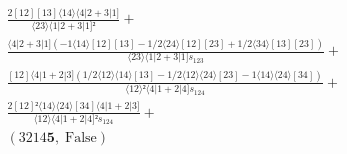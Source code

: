 \documentclass[varwidth, border=5pt]{standalone}
\begin{document}
\begin{my}
$\begin{gathered}
\scriptscriptstyle\frac{2[12][13]⟨14⟩⟨4|2+3|1]}{⟨23⟩⟨1|2+3|1]²} +\\
\scriptscriptstyle\frac{⟨4|2+3|1](-1⟨14⟩[12][13]-1/2⟨24⟩[12][23]+1/2⟨34⟩[13][23])}{⟨23⟩⟨1|2+3|1]s_{123}} +\\
\scriptscriptstyle\frac{[12]⟨4|1+2|3](1/2⟨12⟩⟨14⟩[13]-1/2⟨12⟩⟨24⟩[23]-1⟨14⟩⟨24⟩[34])}{⟨12⟩²⟨4|1+2|4]s_{124}} +\\
\scriptscriptstyle\frac{2[12]²⟨14⟩⟨24⟩[34]⟨4|1+2|3]}{⟨12⟩⟨4|1+2|4]²s_{124}} +\\
\scriptscriptstyle(3214𝟓,\;\text{False}) \phantom{+}
\end{gathered}$
\end{my}
\end{document}

